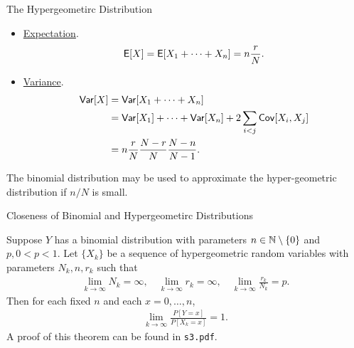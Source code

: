 \begin{frame}{The Hypergeometirc Distribution}

\justifying
\begin{itemize}
	\item \underline{Expectation}. 
	\begin{align*}
	\mathsf{E}[X] = \mathsf{E}[X_1 + \cdots + X_n] = n\frac{r}{N}.
	\end{align*}
	\item \underline{Variance}.
	\begin{align*}
	\mathsf{Var}[X] & = \mathsf{Var}[X_1 + \cdots + X_n] \\
	& = \mathsf{Var}[X_1] + \cdots + \mathsf{Var}[X_n] + 2\sum_{i<j}\mathsf{Cov}[X_i, X_j] \\
	& = n\frac{r}{N}\frac{N-r}{N}\frac{N-n}{N-1}.
	\end{align*}
\end{itemize}
The binomial distribution may be used to approximate the hyper-geometric distribution if $n/N$ is small.

\end{frame}


\begin{frame}{Closeness of Binomial and Hypergeometirc Distributions}

\justifying
{} Suppose $Y$ has a binomial distribution with parameters $n\in \mathbb{N}\setminus\{0\}$ and $p, 0 < p < 1$. Let $\{X_k\}$ be a sequence of hypergeometric random variables with parameters $N_k, n, r_k$ such that
\begin{align*}
\lim_{k\rightarrow \infty} N_k = \infty, \quad \lim_{k\rightarrow \infty} r_k = \infty, \quad \lim_{k\rightarrow \infty} \frac{r_k}{N_k} = p.
\end{align*}
Then for each fixed $n$ and each $x = 0, \ldots, n$,
\begin{align*}
\lim_{k\rightarrow \infty} \frac{P[Y=x]}{P[X_k=x]} = 1.
\end{align*}
A proof of this theorem can be found in \texttt{s3.pdf}.

\end{frame}

